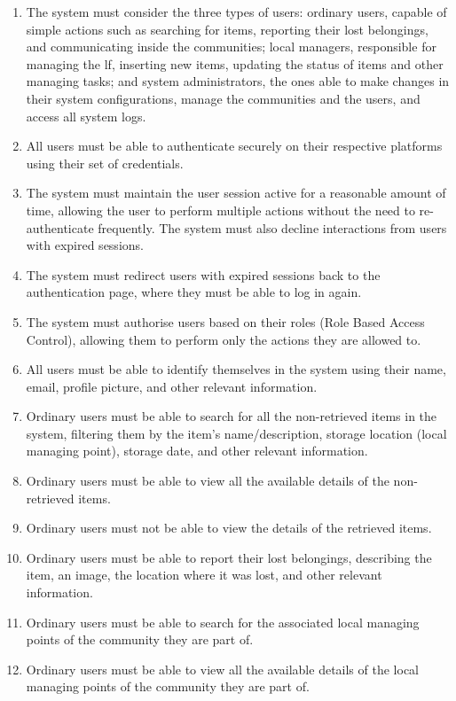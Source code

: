 \begin{enumerate}
    \item The system must consider the three types of users: ordinary users, capable of simple actions such as searching for items, reporting their lost belongings, and communicating inside the communities; local managers, responsible for managing the \ac{lf}, inserting new items, updating the status of items and other managing tasks; and system administrators, the ones able to make changes in their system configurations, manage the communities and the users, and access all system logs.
    \item All users must be able to authenticate securely on their respective platforms using their set of credentials.
    \item The system must maintain the user session active for a reasonable amount of time, allowing the user to perform multiple actions without the need to re-authenticate frequently. The system must also decline interactions from users with expired sessions.
    \item The system must redirect users with expired sessions back to the authentication page, where they must be able to log in again.
    \item The system must authorise users based on their roles (Role Based Access Control), allowing them to perform only the actions they are allowed to.
    \item All users must be able to identify themselves in the system using their name, email, profile picture, and other relevant information.
    \item Ordinary users must be able to search for all the non-retrieved items in the system, filtering them by the item's name/description, storage location (local managing point), storage date, and other relevant information.
    \item Ordinary users must be able to view all the available details of the non-retrieved items.
    \item Ordinary users must not be able to view the details of the retrieved items.
    \item Ordinary users must be able to report their lost belongings, describing the item, an image, the location where it was lost, and other relevant information.
    \item Ordinary users must be able to search for the associated local managing points of the community they are part of.
    \item Ordinary users must be able to view all the available details of the local managing points of the community they are part of.

\end{enumerate}
